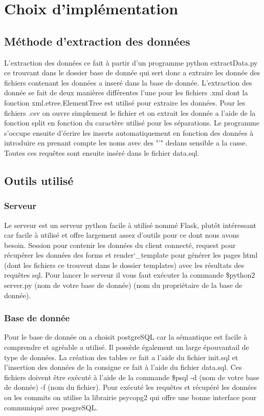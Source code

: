 \documentclass{article}
\begin{document}
\section{Choix d'implémentation}
\subsection{Méthode d'extraction des données}
L'extraction des données ce fait à partir d'un programme python extractData.py ce trouvant dans le dossier base de donnée qui sert donc a extraire les donnée des fichiers contenant les données a inseré dans la base de donnée. L'extraction des donnée se fait de deux manières différentes l'une pour les fichiers .xml dont la fonction xml.etree.ElementTree est utilisé pour extraire les données. Pour les fichiers .csv on ouvre simplement le fichier et on extrait les donnée a l'aide de la fonction split en fonction du caractère utilisé pour les séparations. Le programme s'occupe ensuite d'écrire les inserts automatiquement en fonction des données à introduire en prenant compte les noms avec des "'" dedans sensible a la casse. Toutes ces requêtes sont ensuite inséré dans le fichier data.sql.

\subsection{Outils utilisé}
\subsubsection*{Serveur}
Le serveur est un serveur python facile à utilisé nommé Flask, plutôt intéressant car facile à utilisé et offre largement assez d'outils pour ce dont nous avons besoin. Session pour contenir les données du client connecté, request pour récupérer les données des forms et render\char`_template pour générer les pages html (dont les fichiers ce trouvent dans le dossier templates) avec les résultats des requêtes sql. Pour lancer le serveur il vous faut exécuter la commande \$python2 server.py (nom de votre base de donnée) (nom du propriétaire de la base de donnée).

\subsubsection*{Base de donnée}
Pour le base de donnée on a choisit postgreSQL car la sémantique est facile à comprendre et agréable a utilisé. Il possède également un large épouvantail de type de données. La création des tables ce fait a l'aide du fichier init.sql et l'insertion des données de la consigne ce fait à l'aide du fichier data.sql. Ces fichiers doivent être exécuté à l'aide de la commande \$psql -d (nom de votre base de donnée) -f (nom du fichier). Pour exécuté les requêtes et récupéré les données ou les commits on utilise la librairie psycopg2 qui offre une bonne interface pour communiqué avec posgreSQL. 
\end{document}
